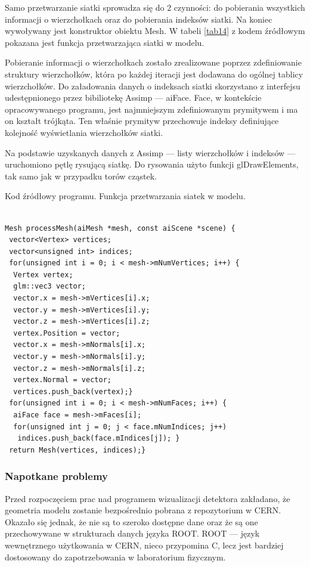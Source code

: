 Samo przetwarzanie siatki sprowadza się do 2 czynności: do pobierania wszystkich informacji o wierzchołkach oraz do pobierania indeksów siatki. Na koniec wywoływany jest konstruktor obiektu Mesh. W tabeli \ref{tab14} z kodem źródłowym pokazana jest funkcja przetwarzająca siatki w modelu.

Pobieranie informacji o wierzchołkach zostało zrealizowane poprzez zdefiniowanie struktury wierzchołków, która po każdej iteracji jest dodawana do ogólnej tablicy wierzchołków. Do załadowania danych o indeksach siatki skorzystano z interfejsu udestępnionego przez bibiliotekę Assimp --- aiFace. Face, w kontekście opracowywanego programu, jest najmniejszym zdefiniowanym prymitywem i ma on kształt trójkąta. Ten właśnie prymityw przechowuje indeksy definiujące kolejność wyświetlania wierzchołków siatki.

Na podstawie uzyskanych danych z Assimp --- listy wierzchołków i indeksów --- uruchomiono pętlę rysującą siatkę. Do rysowania użyto funkcji glDrawElements, tak samo jak w przypadku torów cząstek.

\begin{table}[H]
\caption{Kod źródłowy programu. Funkcja przetwarzania siatek w modelu.}
\label{tab14}
\begin{lstlisting}[frame=single]  % Start your code-block

Mesh processMesh(aiMesh *mesh, const aiScene *scene) {
 vector<Vertex> vertices;
 vector<unsigned int> indices;
 for(unsigned int i = 0; i < mesh->mNumVertices; i++) {
  Vertex vertex;
  glm::vec3 vector;
  vector.x = mesh->mVertices[i].x;
  vector.y = mesh->mVertices[i].y;
  vector.z = mesh->mVertices[i].z;
  vertex.Position = vector;
  vector.x = mesh->mNormals[i].x;
  vector.y = mesh->mNormals[i].y;
  vector.z = mesh->mNormals[i].z;
  vertex.Normal = vector;
  vertices.push_back(vertex);}
 for(unsigned int i = 0; i < mesh->mNumFaces; i++) {
  aiFace face = mesh->mFaces[i];
  for(unsigned int j = 0; j < face.mNumIndices; j++)
   indices.push_back(face.mIndices[j]); }
 return Mesh(vertices, indices);}
\end{lstlisting}
\end{table}

\subsubsection{Napotkane problemy}
Przed rozpoczęciem prac nad programem wizualizacji detektora zakładano, że geometria modelu zostanie bezpośrednio pobrana z repozytorium w CERN. Okazało się jednak, że nie są to szeroko dostępne dane oraz że są one przechowywane w strukturach danych języka ROOT. ROOT --- język wewnętrznego użytkowania w CERN, nieco przypomina C, lecz jest bardziej dostosowany do zapotrzebowania w laboratorium fizycznym.

